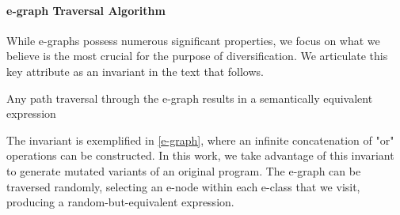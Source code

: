 \documentclass[sigplan,screen]{acmart}
\newcommand*\badge[1]{ \colorbox{red}{\color{white}#1}}
\newcommand{\todo}[1]{%
\refstepcounter{todo}
\noindent\textbf{\badge{TODO}} {\color{red}#1}
\addcontentsline{td}{todo}
{\color{red}\thesection.\thetodo\xspace #1}}
\begin{document}

\paragraph{e-graph Traversal Algorithm}
\label{alg}
While e-graphs possess numerous significant properties, we focus on what we believe is the most crucial for the purpose of diversification. We articulate this key attribute as an invariant in the text that follows.

\begin{tcolorbox}[boxrule=1pt,arc=.3em,boxsep=-1.3mm]
Any path traversal through the e-graph results in a semantically equivalent expression
\end{tcolorbox}

The invariant is exemplified in \autoref{e-graph}, where an infinite concatenation of "or" operations can be constructed. 
In this work, we take advantage of this invariant to generate mutated variants of an original program. 
The e-graph can be traversed randomly, selecting an e-node within each e-class that we visit, producing a random-but-equivalent expression. 



 
\end{document}
